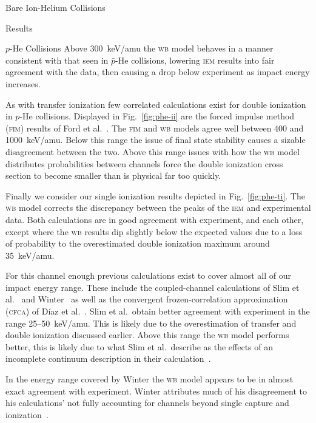 \documentclass[letterpaper, 11 pt]{report}
\begin{document}
\begin{chapter}{Bare Ion-Helium Collisions \label{chap:p-he2p-he}}
\begin{section}{Results \label{sec:phe2p-res}}
\begin{subsection}{\texorpdfstring{$p$}{p}-He Collisions \label{sec:phe-res}}
         Above 300~keV/amu the \textsc{wb} model behaves in a manner consistent with that seen in
         $\bar{p}$-He collisions, lowering \textsc{iem} results into fair agreement with the data, then
         causing a drop below experiment as impact energy increases.

         As with transfer ionization few correlated calculations exist for double ionization in $p$-He
         collisions. Displayed in Fig.~\ref{fig:phe-ii} are the forced impulse method (\textsc{fim})
         results of Ford et al.~\cite{FR-94}. The \textsc{fim} and \textsc{wb} models agree well between
         400 and 1000~keV/amu. Below this range the issue of final state stability causes a sizable
         disagreement between the two. Above this range issues with how the \textsc{wb} model
         distributes probabilities between channels force  the double ionization cross section to become
         smaller than is physical far too quickly.

         Finally we consider our single ionization results depicted in Fig.~\ref{fig:phe-ti}. The
         \textsc{wb} model corrects the discrepancy between the peaks of the \textsc{iem} and
         experimental data. Both calculations are in good agreement with experiment, and each other,
         except where the \textsc{wb} results dip slightly below the expected values due to a loss of
         probability to the overestimated double ionization maximum around 35~keV/amu.

         For this channel enough previous calculations exist to cover almost all of our impact energy
         range. These include the coupled-channel calculations of Slim et al.~\cite{SHBF-91} and
         Winter~\cite{Winter-91} as well as the convergent frozen-correlation approximation
         (\textsc{cfca}) of D\'{i}az et al.~\cite{DMS-00}. Slim et al.\ obtain better agreement with
         experiment in the range 25--50~keV/amu. This is likely due to the overestimation of transfer
         and double ionization discussed earlier. Above this range the \textsc{wb} model performs
         better, this is likely due to what Slim et al.\ describe as the effects of an incomplete
         continuum description in their calculation~\cite{SHBF-91}.

         In the energy range covered by Winter the \textsc{wb} model appears to be in almost exact
         agreement with experiment. Winter attributes much of his disagreement to his calculations' not
         fully accounting for channels beyond single capture and ionization~\cite{Winter-91}.


\end{subsection}
\end{section}
\end{chapter}
\end{document}
